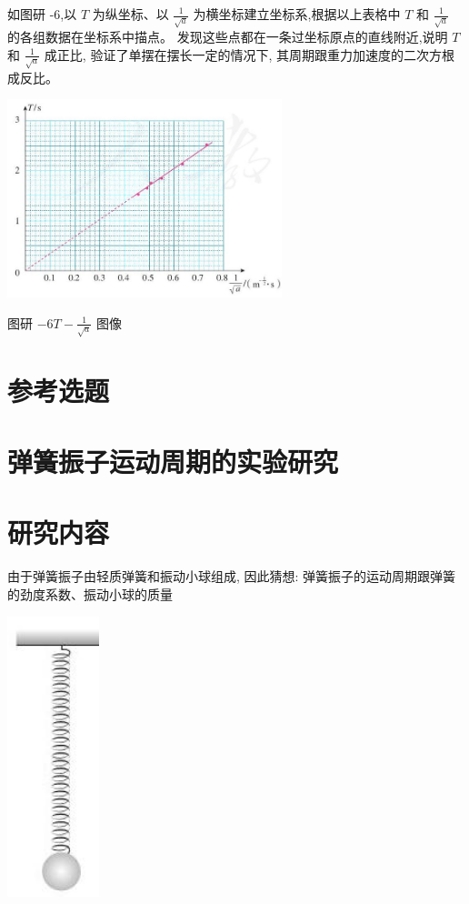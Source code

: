 \documentclass[10pt]{article}
\begin{document}
如图研 -6,以 \(T\) 为纵坐标、以 \(\frac{1}{\sqrt{a}}\) 为横坐标建立坐标系,根据以上表格中 \(T\) 和 \(\frac{1}{\sqrt{a}}\) 的各组数据在坐标系中描点。 发现这些点都在一条过坐标原点的直线附近,说明 \(T\) 和 \(\frac{1}{\sqrt{a}}\) 成正比, 验证了单摆在摆长一定的情况下, 其周期跟重力加速度的二次方根成反比。

\begin{center}
\includegraphics[max width=0.6\textwidth]{images/01910e4c-ebb8-7d2c-8f2f-2375bc1d2d12_124_161975.jpg}
\end{center}

图研 \(- {6T} - \frac{1}{\sqrt{a}}\) 图像

\section*{参考选题}

\section*{弹簧振子运动周期的实验研究}

\section*{研究内容}

由于弹簧振子由轻质弹簧和振动小球组成, 因此猜想: 弹簧振子的运动周期跟弹簧的劲度系数、振动小球的质量

\begin{center}
\includegraphics[max width=0.2\textwidth]{images/01910e4c-ebb8-7d2c-8f2f-2375bc1d2d12_125_263796.jpg}
\end{center}
\end{document}
